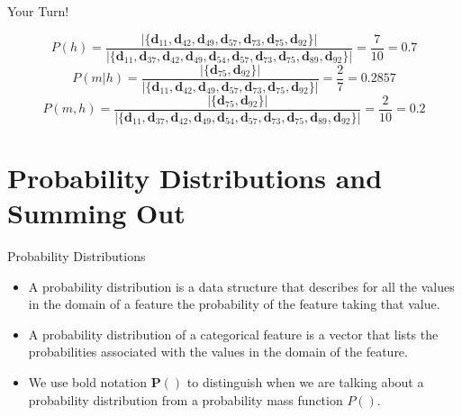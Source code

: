 \documentclass[xcolor={table}]{beamer}
\begin{document}
\begin{frame} 
 \begin{block}{Your Turn!}
 \begin{footnotesize}
\begin{equation*}
P(h)=\frac{ \left| \{ \mathbf{d}_{11}, \mathbf{d}_{42}, \mathbf{d}_{49}, \mathbf{d}_{57}, \mathbf{d}_{73}, \mathbf{d}_{75}, \mathbf{d}_{92} \} \right| }{ \left| \{ \mathbf{d}_{11}, \mathbf{d}_{37}, \mathbf{d}_{42}, \mathbf{d}_{49}, \mathbf{d}_{54}, \mathbf{d}_{57}, \mathbf{d}_{73}, \mathbf{d}_{75}, \mathbf{d}_{89}, \mathbf{d}_{92} \} \right| } = \frac{7}{10} = 0.7
\end{equation*}
\begin{equation*}
P(m|h)=\frac{ \left| \{ \mathbf{d}_{75}, \mathbf{d}_{92} \} \right| }{ \left| \{ \mathbf{d}_{11}, \mathbf{d}_{42}, \mathbf{d}_{49}, \mathbf{d}_{57}, \mathbf{d}_{73}, \mathbf{d}_{75}, \mathbf{d}_{92} \} \right| } = \frac{2}{7} = 0.2857
\end{equation*}
\begin{equation*}
P(m,h)=\frac{ \left| \{  \mathbf{d}_{75}, \mathbf{d}_{92} \} \right| }{ \left| \{ \mathbf{d}_{11}, \mathbf{d}_{37}, \mathbf{d}_{42}, \mathbf{d}_{49}, \mathbf{d}_{54}, \mathbf{d}_{57}, \mathbf{d}_{73}, \mathbf{d}_{75}, \mathbf{d}_{89}, \mathbf{d}_{92} \} \right| } = \frac{2}{10} = 0.2
\end{equation*}
\end{footnotesize}
\end{block}
\end{frame} 

\section{Probability Distributions and Summing Out}

\begin{frame}
\begin{alertblock}{Probability Distributions}
\begin{itemize}
	\item A probability distribution is a data structure that describes for all the values in the domain of a feature the probability of the feature taking that value. 
	\item A probability distribution of a categorical feature is a vector that lists the probabilities associated with the values in the domain of the feature.
	\item We use bold notation $\mathbf{P}()$ to distinguish when we are talking about a probability distribution  from a probability mass function $P()$.
	\end{itemize}
\end{alertblock}
\end{frame}
\end{document}
